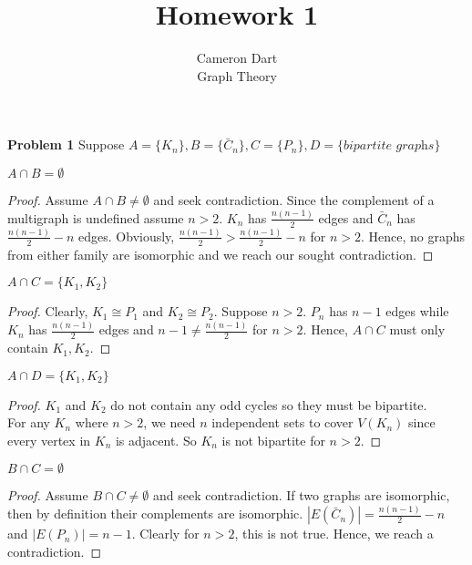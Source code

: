 \documentclass{article}
\newenvironment{claim}[2][Claim]{\begin{trivlist}
		\item[\hskip \labelsep {\bfseries #1}\hskip \labelsep {\bfseries #2}]}{\end{trivlist}}
\begin{document}
\title{Homework 1} %
\author{Cameron Dart\\ Graph Theory} %

\maketitle

\noindent\textbf{Problem 1}
Suppose $A = \{ K_n \}, B = \{ \bar C_n \} , C = \{P_n\}, D = \{ \textit{bipartite graphs} \} $
\begin{claim}{}
$A \cap B = \emptyset$
\end{claim}
\begin{proof}
Assume $A \cap B \neq \emptyset$ and seek contradiction. Since the complement of a multigraph is undefined assume $n > 2$. $K_n$ has
$\frac{n(n-1)}{2}$ edges and $\bar C_n$ has $\frac{n (n-1)}{2} - n$ edges. Obviously, $\frac{n (n-1)}{2} > \frac{n(n-1)}{2} - n$ for $n > 2$. Hence, no graphs from either family are isomorphic and we reach our sought contradiction.
\end{proof}

\begin{claim}{}
$A \cap C = \{ K_1, K_2 \}$
\end{claim}
\begin{proof}
Clearly, $K_1 \cong P_1$ and $K_2 \cong P_2$. Suppose $n > 2$. $P_n$ has $n - 1$ edges while $K_n$ has $\frac{n(n-1)}{2}$ edges and $n-1 \neq \frac{n(n-1)}{2}$ for $n > 2$. Hence, $A \cap C$ must only contain $K_1, K_2$.
\end{proof}

\begin{claim}{} 
$A \cap D = \{ K_1, K_2 \}$
\end{claim}
\begin{proof}
$K_1$ and $K_2$ do not contain any odd cycles so they must be bipartite.\\
For any $K_n$ where $n > 2$, we need $n$ independent sets to cover $V(K_n)$ since every vertex in $K_n$ is adjacent. So $K_n$ is not bipartite for $n > 2$. 
\end{proof}

\begin{claim}{}
$B \cap C = \emptyset$
\end{claim}
\begin{proof}
Assume $B \cap C \neq \emptyset$ and seek contradiction.
If two graphs are isomorphic, then by definition their complements are isomorphic. $|E(\bar C_n)| = \frac{n(n-1)}{2} - n $ and $|E(P_n)| = n - 1$. Clearly for $n > 2$, this is not true. Hence, we reach a contradiction.
\end{proof}
\end{document}
